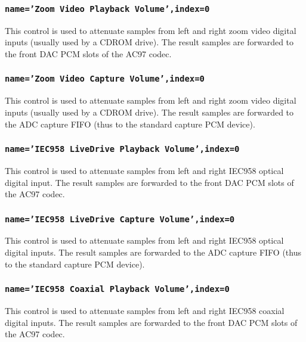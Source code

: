 \documentclass[a4paper,8pt,english]{sphinxmanual}
\begin{document}
\subsubsection{\texttt{name='Zoom Video Playback Volume',index=0}}
\label{sound/cards/sb-live-mixer:name-zoom-video-playback-volume-index-0}
This control is used to attenuate samples from left and right zoom video
digital inputs (usually used by a CDROM drive). The result samples are
forwarded to the front DAC PCM slots of the AC97 codec.


\subsubsection{\texttt{name='Zoom Video Capture Volume',index=0}}
\label{sound/cards/sb-live-mixer:name-zoom-video-capture-volume-index-0}
This control is used to attenuate samples from left and right zoom video
digital inputs (usually used by a CDROM drive). The result samples are
forwarded to the ADC capture FIFO (thus to the standard capture PCM device).


\subsubsection{\texttt{name='IEC958 LiveDrive Playback Volume',index=0}}
\label{sound/cards/sb-live-mixer:name-iec958-livedrive-playback-volume-index-0}
This control is used to attenuate samples from left and right IEC958 optical
digital input. The result samples are forwarded to the front DAC PCM slots
of the AC97 codec.


\subsubsection{\texttt{name='IEC958 LiveDrive Capture Volume',index=0}}
\label{sound/cards/sb-live-mixer:name-iec958-livedrive-capture-volume-index-0}
This control is used to attenuate samples from left and right IEC958 optical
digital inputs. The result samples are forwarded to the ADC capture FIFO
(thus to the standard capture PCM device).


\subsubsection{\texttt{name='IEC958 Coaxial Playback Volume',index=0}}
\label{sound/cards/sb-live-mixer:name-iec958-coaxial-playback-volume-index-0}
This control is used to attenuate samples from left and right IEC958 coaxial
digital inputs. The result samples are forwarded to the front DAC PCM slots
of the AC97 codec.
\end{document}
